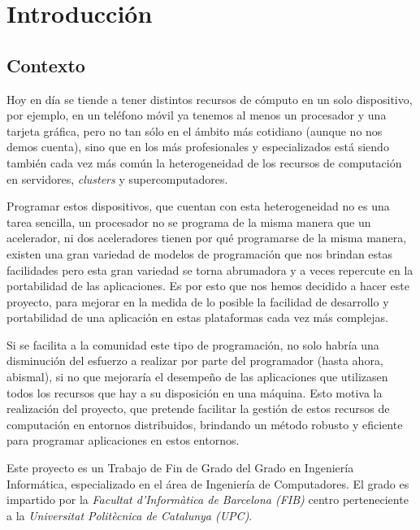 \chapter{Introducción}

\section{Contexto}

Hoy en día se tiende a tener distintos recursos de cómputo en un solo dispositivo, por ejemplo, en un teléfono móvil ya tenemos al menos un procesador y una tarjeta gráfica, pero no tan sólo en el ámbito más cotidiano (aunque no nos demos cuenta), sino que en los más profesionales y especializados está siendo también cada vez más común la heterogeneidad de los recursos de computación en servidores, \textit{clusters} y supercomputadores. 

\par\bigskip

Programar estos dispositivos, que cuentan con esta heterogeneidad no es una tarea sencilla, un procesador no se programa de la misma manera que un acelerador, ni dos aceleradores tienen por qué programarse de la misma manera, existen una gran variedad de modelos de programación que nos brindan estas facilidades pero esta gran variedad se torna abrumadora y a veces repercute en la portabilidad de las aplicaciones. Es por esto que nos hemos decidido a hacer este proyecto, para mejorar en la medida de lo posible la facilidad de desarrollo y portabilidad de una aplicación en estas plataformas cada vez más complejas.

\par\bigskip

Si se facilita a la comunidad este tipo de programación, no solo habría una disminución del esfuerzo a realizar por parte del programador (hasta ahora, abismal), si no que mejoraría el desempeño de las aplicaciones que utilizasen todos los recursos que hay a su disposición en una máquina. Esto motiva la realización del proyecto, que pretende facilitar la gestión de estos recursos de computación en entornos distribuidos, brindando un método robusto y eficiente para programar aplicaciones en estos entornos.

\par\bigskip

Este proyecto es un Trabajo de Fin de Grado del Grado en Ingeniería Informática, especializado en el área de Ingeniería de Computadores. El grado es impartido por la \textit{Facultat d'Informàtica de Barcelona (FIB)} centro perteneciente a la \textit{Universitat Politècnica de Catalunya (UPC)}. 
\par\bigskip

